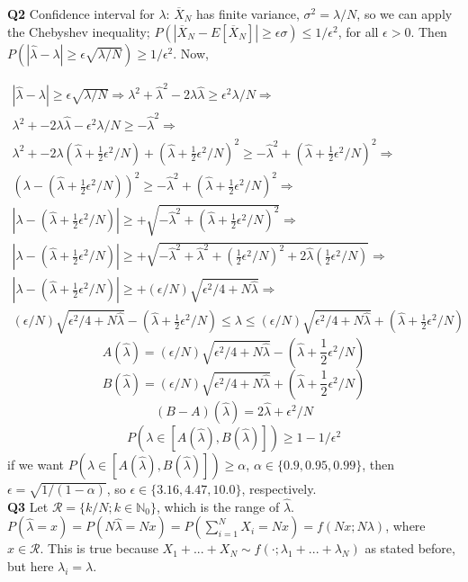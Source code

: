 \documentclass[12pt]{article}
\newcommand{\rimply}[0] { \Rightarrow }
\newcommand{\nats}[0] { \mathbb{N}}
\newcommand{\eps}[0] {  \epsilon }
\newcommand{\lam}[0] {  \lambda }
\newcommand{\R}[0] { \mathcal{R} }
\begin{document}
{\bf Q2} Confidence interval for $\lam$: $\overline X_N$ has finite variance, $\sigma^2 = \lam/N$, so we can apply the Chebyshev inequality; $P(|\overline X_N - E[\overline X_N]| \ge \eps \sigma) \le 1/\eps^2$, for all $\eps >0$. Then $P(|\hat \lam - \lam|\ge \eps \sqrt{\lam / N}) \ge 1/\eps^2$. Now,

\begin{eqnarray}
|\hat \lam - \lam | \ge \eps \sqrt{\lam / N} \rimply  \lam^2 + \hat \lam ^2 - 2 \lam \hat \lam \ge \eps^2 \lam / N \rimply\\
 \lam^2 + - 2 \lam \hat \lam - \eps^2 \lam / N  \ge  -\hat \lam ^2\rimply \\
 \lam^2 + - 2 \lam (\hat \lam + \frac{1}{2} \eps^2 / N) + (\hat \lam + \frac{1}{2} \eps^2 / N)^2   \ge  -\hat \lam ^2 + (\hat \lam + \frac{1}{2} \eps^2 / N)^2 \rimply \\
 (\lam - (\hat \lam + \frac{1}{2} \eps^2 / N))^2   \ge  -\hat \lam ^2 + (\hat \lam + \frac{1}{2} \eps^2 / N)^2 \rimply \\
|\lam - (\hat \lam + \frac{1}{2} \eps^2 / N) |   \ge + \sqrt{-\hat \lam ^2 + (\hat \lam + \frac{1}{2} \eps^2 / N)^2 }\rimply \\
|\lam - (\hat \lam + \frac{1}{2} \eps^2 / N) |   \ge + \sqrt{-\hat \lam ^2 + \hat \lam  ^2 + (\frac{1}{2} \eps^2 / N)^2 + 2 \hat \lam (\frac{1}{2} \eps^2 / N) }  \rimply \\
|\lam - (\hat \lam + \frac{1}{2} \eps^2 / N) |   \ge + ( \eps / N) \sqrt{  \eps^2 / 4 + N \hat \lam  }  \rimply \\
 ( \eps / N) \sqrt{  \eps^2 / 4 + N \hat \lam  } -  (\hat \lam + \frac{1}{2} \eps^2 / N) \le \lam \le  ( \eps / N) \sqrt{  \eps^2 / 4 + N \hat \lam  } + (\hat \lam + \frac{1}{2} \eps^2 / N)
\end{eqnarray}
$$
A(\hat \lam ) =  ( \eps / N) \sqrt{  \eps^2 / 4 + N \hat \lam  } -  (\hat \lam + \frac{1}{2} \eps^2 / N)
$$
$$
B(\hat \lam ) =  ( \eps / N) \sqrt{  \eps^2 / 4 + N \hat \lam  } +  (\hat \lam + \frac{1}{2} \eps^2 / N)
$$
$$
(B-A)(\hat \lam) =  2 \hat \lam +  \eps^2 / N
$$
$$
P(\lam \in [A(\hat \lam), B(\hat \lam)]) \ge 1- 1 / \eps^2
$$
if we want $P(\lam \in [A(\hat \lam), B(\hat \lam)]) \ge \alpha$, $\alpha \in \{ 0.9, 0.95, 0.99\}$, then $\eps = \sqrt{1/(1-\alpha)}$, so $\eps \in \{ 3.16, 4.47, 10.0\}$, respectively. \\ 


{\bf Q3} Let $\R = \{ k/N; k \in \nats_0\}$, which is the range of $\hat \lam$. $P(\hat \lam = x) = P(N \hat \lam = N x) = P(\sum_{i=1}^N X_i = N x) = f(N x ; N \lam)$, where $x \in \R$. This is true because $X_1 + ... + X_N \sim f(\cdot; \lam_1 + ... + \lam_N)$ as stated before, but here $\lam_i = \lam$. \\
\end{document}
